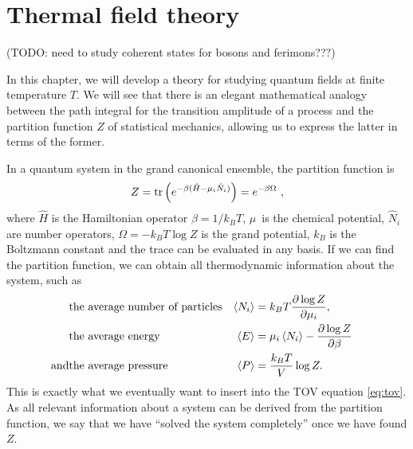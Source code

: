 \chapter{Thermal field theory}

(TODO: need to study coherent states for bosons and ferimons???)

\newcommand{\transampl}{\braket{\phi_B | e^{- i \hat{H} T / \hbar} | \phi_A}}

In this chapter, we will develop a theory for studying quantum fields at finite temperature $T$.
We will see that there is an elegant mathematical analogy between the path integral for the transition amplitude of a process and the partition function $Z$ of statistical mechanics, allowing us to express the latter in terms of the former.

In a quantum system in the grand canonical ensemble, the partition function is 
\begin{equation}
	Z = \trace \left( e^{-\beta (\hat{H} - \mu_i \hat{N}_i)} \right) = e^{-\beta \Omega} ,
\end{equation}
where $\hat{H}$ is the Hamiltonian operator $\beta = 1 / k_B T$, $\mu$ is the chemical potential, $\hat{N}_i$ are number operators, $\Omega = -k_B T \log{Z}$ is the grand potential, $k_B$ is the Boltzmann constant and the trace can be evaluated in any basis.
If we can find the partition function, we can obtain all thermodynamic information about the system, such as \cite[chapter 5]{ref:jensoluf}
\begin{align}
	           & \text{the average number of particles} & \thermalavg{N_i} & = k_B T \pdv{\log{Z}}{\mu_i},                    & \\
	           & \text{the average energy}              & \thermalavg{E}   & = \mu_i \thermalavg{N_i} - \pdv{\log{Z}}{\beta}  & \\ %
	\text{and} & \text{the average pressure}            & \thermalavg{P}   & = \frac{k_B T}{V} \log{Z}.                       &    %
\end{align}
This is exactly what we eventually want to insert into the TOV equation \eqref{eq:tov}.
As all relevant information about a system can be derived from the partition function, we say that we have ``solved the system completely'' once we have found $Z$.

